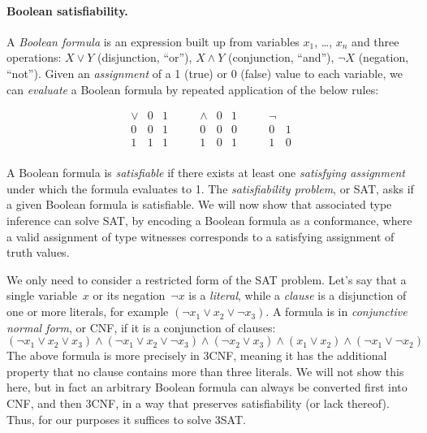 \documentclass[../generics]{subfiles}
\begin{document}
\paragraph{Boolean satisfiability.}
A \emph{Boolean formula} is an expression built up from variables $x_1$, \ldots, $x_n$ and three operations: $X \vee Y$ (disjunction, ``or''), $X \wedge Y$ (conjunction, ``and''), $\neg X$ (negation, ``not''). Given an \emph{assignment} of a 1 (true) or 0 (false) value to each variable, we can \emph{evaluate} a Boolean formula by repeated application of the below rules:
\begin{ceqn}
\[
\begin{array}{c|cc}
\vee & 0 & 1\\
\hline
0 & 0 & 1\\
1 & 1 & 1\\
\end{array}
\qquad
\begin{array}{c|cc}
\wedge & 0 & 1\\
\hline
0 & 0 & 0\\
1 & 0 & 1\\
\end{array}
\qquad
\begin{array}{c|c}
\neg &\\
\hline
0 & 1\\
1 & 0
\end{array}
\]
\end{ceqn}
A Boolean formula is \emph{satisfiable} if there exists at least one \emph{satisfying assignment} under which the formula evaluates to 1. The \emph{satisfiability problem}, or SAT, asks if a given Boolean formula is satisfiable. We will now show that associated type inference can solve SAT, by encoding a Boolean formula as a conformance, where a valid assignment of type witnesses corresponds to a satisfying assignment of truth values.

We only need to consider a restricted form of the SAT problem. Let's say that a single variable~$x$ or its negation~$\neg x$ is a \emph{literal}, while a \emph{clause} is a disjunction of one or more literals, for example $(\neg x_1 \vee x_2 \vee \neg x_3)$. A formula is in \emph{conjunctive normal form}, or CNF, if it is a conjunction of clauses:
\[(\neg x_1 \vee x_2 \vee x_3) \wedge (\neg x_1 \vee x_2 \vee \neg x_3) \wedge (\neg x_2 \vee x_3) \wedge (x_1 \vee x_2) \wedge (\neg x_1 \vee \neg x_2)\]
The above formula is more precisely in 3CNF, meaning it has the additional property that no clause contains more than three literals. We will not show this here, but in fact an arbitrary Boolean formula can always be converted first into CNF, and then 3CNF, in a way that preserves satisfiability (or lack thereof). Thus, for our purposes it suffices to solve 3SAT.
\end{document}
